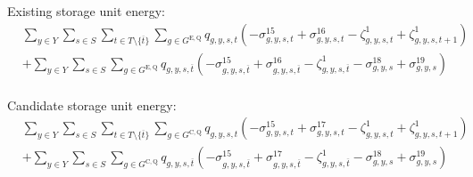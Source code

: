 \documentclass{article}
\newcommand{\sGeneratorsExistingThermal}{G^{\mathrm{E,T}}}
\newcommand{\sStorageExisting}{G^{\mathrm{E,Q}}}
\newcommand{\sStorageCandidate}{G^{\mathrm{C,Q}}}
\newcommand{\sYears}{Y}
\newcommand{\sScenarios}{S}
\newcommand{\sIntervals}{T}
\newcommand{\iGenerator}{g}
\newcommand{\iYear}{y}
\newcommand{\iYearTerminal}{\overline{\iYear}}
\newcommand{\iScenario}{s}
\newcommand{\iInterval}{t}
\newcommand{\iIntervalTerminal}{\overline{\iInterval}}
\newcommand{\cScenarioDuration}[1][\iYear,\iScenario]{\rho_{#1}}
\newcommand{\cMarginalCost}[1][\iGenerator,\iYear]{C^{\mathrm{MC}}_{#1}}
\newcommand{\cEmissionsIntensity}[1][\iGenerator]{E_{#1}}
\newcommand{\cInterestRate}{i}
\newcommand{\cDiscountRate}[1][\iYear]{\delta_{#1}}
\newcommand{\vBaseline}[1][\iYear]{\phi_{#1}}
\newcommand{\vPermitPrice}[1][\iYear]{\tau_{#1}}
\newcommand{\vEnergy}[1][\iGenerator,\iYear,\iScenario,\iInterval]{e_{#1}}
\newcommand{\vStorageUnitEnergy}[1][\iGenerator,\iYear,\iScenario,\iInterval]{q_{#1}}
\newcommand{\dNonNegativeStorageEnergy}[1][\iGenerator,\iYear,\iScenario,\iInterval]{\sigma_{#1}^{15}}
\newcommand{\dMaxStorageEnergyExisting}[1][\iGenerator,\iYear,\iScenario,\iInterval]{\sigma_{#1}^{16}}
\newcommand{\dMaxStorageEnergyCandidate}[1][\iGenerator,\iYear,\iScenario,\iInterval]{\sigma_{#1}^{17}}
\newcommand{\dMinStorageEnergyIntervalEnd}[1][\iGenerator,\iYear,\iScenario]{\sigma_{#1}^{18}}
\newcommand{\dMaxStorageEnergyIntervalEnd}[1][\iGenerator,\iYear,\iScenario]{\sigma_{#1}^{19}}
\newcommand{\dStorageEnergyTransition}[1][\iGenerator,\iYear,\iScenario,\iInterval]{\zeta_{#1}^{1}}
\newcommand{\dGeneratorEnergyOutput}[1][\iGenerator,\iYear,\iScenario,\iInterval]{\zeta_{#1}^{2}}
\begin{document}
Existing storage unit energy:
\begin{align}
	& \sum\limits_{\iYear \in \sYears}\sum\limits_{\iScenario \in \sScenarios} \sum\limits_{\iInterval \in \sIntervals \setminus \{\iIntervalTerminal\}} \sum\limits_{\iGenerator \in \sStorageExisting} \vStorageUnitEnergy \left(- \dNonNegativeStorageEnergy + \dMaxStorageEnergyExisting - \dStorageEnergyTransition + \dStorageEnergyTransition[\iGenerator,\iYear,\iScenario,\iInterval+1] \right)\\
	& + \sum\limits_{\iYear \in \sYears}\sum\limits_{\iScenario \in \sScenarios}\sum\limits_{\iGenerator \in \sStorageExisting} \vStorageUnitEnergy[\iGenerator,\iYear,\iScenario,\iIntervalTerminal] \left(- \dNonNegativeStorageEnergy[\iGenerator,\iYear,\iScenario,\iIntervalTerminal] + \dMaxStorageEnergyExisting[\iGenerator,\iYear,\iScenario,\iIntervalTerminal] - \dStorageEnergyTransition[\iGenerator,\iYear,\iScenario,\iIntervalTerminal] - \dMinStorageEnergyIntervalEnd + \dMaxStorageEnergyIntervalEnd \right)\\
\end{align}

Candidate storage unit energy:
\begin{align}
	& \sum\limits_{\iYear \in \sYears}\sum\limits_{\iScenario \in \sScenarios} \sum\limits_{\iInterval \in \sIntervals \setminus \{\iIntervalTerminal\}} \sum\limits_{\iGenerator \in \sStorageCandidate} \vStorageUnitEnergy \left(- \dNonNegativeStorageEnergy + \dMaxStorageEnergyCandidate - \dStorageEnergyTransition + \dStorageEnergyTransition[\iGenerator,\iYear,\iScenario,\iInterval+1] \right)\\
	& + \sum\limits_{\iYear \in \sYears}\sum\limits_{\iScenario \in \sScenarios}\sum\limits_{\iGenerator \in \sStorageCandidate} \vStorageUnitEnergy[\iGenerator,\iYear,\iScenario,\iIntervalTerminal] \left(- \dNonNegativeStorageEnergy[\iGenerator,\iYear,\iScenario,\iIntervalTerminal] + \dMaxStorageEnergyCandidate[\iGenerator,\iYear,\iScenario,\iIntervalTerminal] - \dStorageEnergyTransition[\iGenerator,\iYear,\iScenario,\iIntervalTerminal] - \dMinStorageEnergyIntervalEnd + \dMaxStorageEnergyIntervalEnd \right)\\
\end{align}

\end{document}
